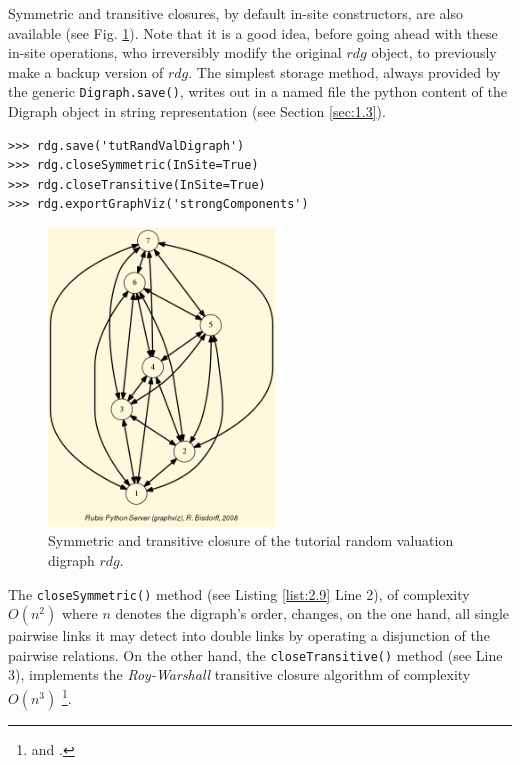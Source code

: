 Symmetric and transitive closures, by default in-site constructors, are also available (see Fig. \ref{fig:2.5}). Note that it is a good idea, before going ahead with these in-site operations, who irreversibly modify the original $rdg$ object, to previously make a backup version of $rdg$. The simplest storage method, always provided by the generic \texttt{Digraph.save()}, writes out in a named file the python content of the Digraph object in string representation (see Section \ref{sec:1.3}).
\begin{lstlisting}[caption={Symmeric and transitive closures},label=list:2.9]
>>> rdg.save('tutRandValDigraph')
>>> rdg.closeSymmetric(InSite=True)
>>> rdg.closeTransitive(InSite=True)
>>> rdg.exportGraphViz('strongComponents')
\end{lstlisting}
\begin{figure}[h]
\sidecaption[t]
\includegraphics[width=6cm]{Figures/strongComponents.png}
\caption{Symmetric and transitive closure of the tutorial random valuation digraph $rdg$.}
\label{fig:2.5}       %
\end{figure}

The \texttt{closeSymmetric()} method (see Listing \ref{list:2.9}  Line 2), of complexity $O(n^2)$ where $n$ denotes the digraph's order, changes, on the one hand, all single pairwise links it may detect into double links by operating a disjunction of the pairwise relations. On the other hand, the \texttt{closeTransitive()}  method (see Line 3), implements the \emph{Roy-Warshall} transitive closure algorithm of complexity $O(n^3)$ \footnote{\citet{ROY-1959} and \citet{WAR-1962}.}.

